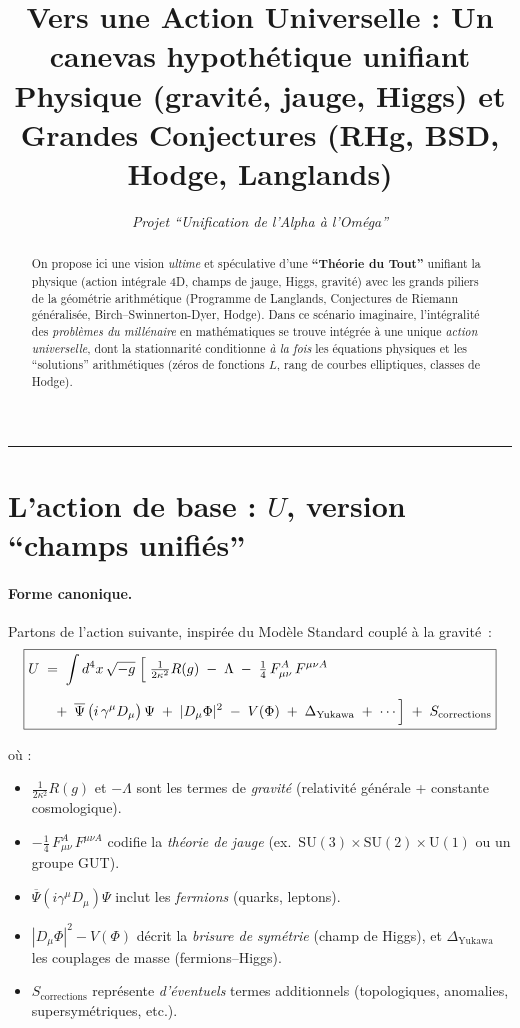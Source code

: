 \documentclass[11pt]{article}
\title{\textbf{Vers une Action Universelle : Un canevas hypothétique unifiant\\
Physique (gravité, jauge, Higgs) et Grandes Conjectures (RHg, BSD, Hodge, Langlands)}}
\author{\textit{Projet “Unification de l’Alpha à l’Oméga”}}
\date{}
\begin{document}
\maketitle

\begin{abstract}
On propose ici une vision \emph{ultime} et spéculative d'une \textbf{“Théorie du Tout”} unifiant la physique (action intégrale 4D, champs de jauge, Higgs, gravité) avec les grands piliers de la géométrie arithmétique (Programme de Langlands, Conjectures de Riemann généralisée, Birch--Swinnerton-Dyer, Hodge). Dans ce scénario imaginaire, l'intégralité des \emph{problèmes du millénaire} en mathématiques se trouve intégrée à une unique \emph{action universelle}, dont la stationnarité conditionne \emph{à la fois} les équations physiques et les “solutions” arithmétiques (zéros de fonctions $L$, rang de courbes elliptiques, classes de Hodge). 
\end{abstract}

\hrule
\vspace{6pt}

\section{L'action de base : \texorpdfstring{$U$}{U}, version “champs unifiés”}
\label{sec:action_U}

\paragraph{Forme canonique.}
Partons de l'action suivante, inspirée du Modèle Standard couplé à la gravité~:
\[
\boxed{
\begin{aligned}
U
&\;=\;
\int d^4 x\,\sqrt{-g}\;
\Bigl[\;
\tfrac{1}{2\kappa^2}R(g)
\;-\;\Lambda
\;-\;\tfrac14\,F_{\mu\nu}^A\,F^{\mu\nu A}
\\[6pt]
&\quad+\;\overline{\Psi}\,\bigl(i\,\gamma^\mu D_\mu\bigr)\,\Psi
\;+\;|D_\mu \Phi|^2 \;-\; V(\Phi)
\;+\;\Delta_{\text{Yukawa}}
\;+\;\cdots
\Bigr]
\;+\;
S_{\text{corrections}}
\end{aligned}
}
\]

où :
\begin{itemize}
  \item \(\tfrac{1}{2\kappa^2}R(g)\) et \(-\Lambda\) sont les termes de \emph{gravité} (relativité générale + constante cosmologique).
  \item \(-\tfrac14\,F_{\mu\nu}^A\,F^{\mu\nu A}\) codifie la \emph{théorie de jauge} (ex.~$\mathrm{SU}(3)\times \mathrm{SU}(2)\times \mathrm{U}(1)$ ou un groupe GUT).
  \item \(\overline{\Psi}(i\gamma^\mu D_\mu)\Psi\) inclut les \emph{fermions} (quarks, leptons).
  \item \(|D_\mu \Phi|^2 - V(\Phi)\) décrit la \emph{brisure de symétrie} (champ de Higgs), et \(\Delta_{\text{Yukawa}}\) les couplages de masse (fermions--Higgs).
  \item \(S_{\text{corrections}}\) représente \emph{d'éventuels} termes additionnels (topologiques, anomalies, supersymétriques, etc.).
\end{itemize}
\end{document}
